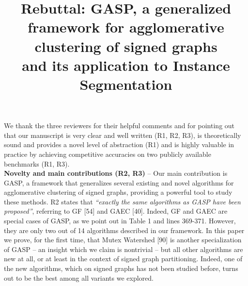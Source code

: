 \documentclass[10pt,twocolumn,letterpaper]{article}
\begin{document}
\title{Rebuttal: GASP, a generalized framework for agglomerative clustering of signed graphs \\ and its application to Instance Segmentation}  %

\maketitle
\thispagestyle{empty}

We thank the three reviewers for their helpful comments and for pointing out that our manuscript is very clear and well written (R1, R2, R3), is theoretically sound and provides a novel level of abstraction (R1) and is highly valuable in practice by achieving competitive accuracies on two publicly available benchmarks (R1, R3). \\


\textbf{Novelty and main contributions (R2, R3)} --
Our main contribution is GASP, a  framework that generalizes several existing and novel algorithms for agglomerative clustering of signed graphs, providing a powerful tool to study these methods.
R2 states that \emph{``exactly the same algorithms as GASP have been proposed''}, referring to GF [54] and GAEC [40]. 
Indeed, GF and GAEC are special cases of GASP, as we point out in Table 1 and lines 369-371. However, they are only two out of 14 algorithms described in our framework. In this paper we prove, for the first time, that Mutex Watershed [90] is another specialization of GASP -- an insight which we claim is nontrivial -- but all other algorithms are new at all, or at least in the context of signed graph partitioning. Indeed, one of the new algorithms, which on signed graphs has not been studied before, turns out to be the best among all variants we explored.
\end{document}
